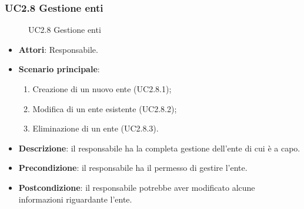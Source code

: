 \subsubsection{UC2.8 Gestione enti}
\begin{figure}[H]
\centering
\noindent{}
\caption{UC2.8 Gestione enti}
\end{figure}
\begin{itemize}
\item \textbf{Attori}: Responsabile.
\item \textbf{Scenario principale}:
\begin{enumerate}
\item Creazione di un nuovo ente (UC2.8.1);
\item Modifica di un ente esistente (UC2.8.2);
\item Eliminazione di un ente (UC2.8.3).
\end{enumerate}
\item \textbf{Descrizione}: il responsabile ha la completa gestione dell'ente di cui è a capo.
\item \textbf{Precondizione}: il responsabile ha il permesso di gestire l'ente.
\item \textbf{Postcondizione}: il responsabile potrebbe aver modificato alcune informazioni riguardante l'ente.
\end{itemize}
